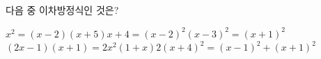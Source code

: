 다음 중 이차방정식인 것은?
\begin{choicesv}{$x^2=(x-2)(x+5)$}{$x+4=(x-2)^2$}{$(x-3)^2=(x+1)^2$}{$(2x-1)(x+1)=2x^2(1+x)$}{$2(x+4)^2=(x-1)^2+(x+1)^2$}\end{choicesv}
